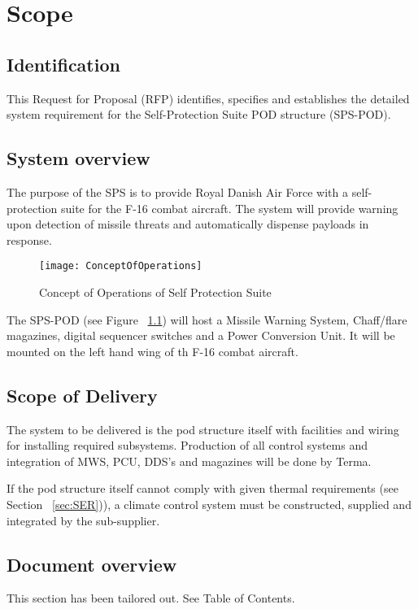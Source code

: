 \documentclass[Main]{subfiles}
\begin{document}
\chapter{Scope}

\section{Identification}
This Request for Proposal (RFP) identifies, specifies and establishes the detailed system requirement for the Self-Protection Suite POD structure (SPS-POD).

\section{System overview}
The purpose of the SPS is to provide Royal Danish Air Force with a self-protection suite for the F-16 combat aircraft. 
The system will provide warning upon detection of missile threats and automatically dispense payloads in response.

\begin{figure}[H]
\centering
\texttt{[image: ConceptOfOperations]}
\caption{Concept of Operations of Self Protection Suite}
\label{fig:conOps}
\end{figure}

The SPS-POD (see Figure ~\ref{fig:conOps}) will host a Missile Warning System, Chaff/flare magazines, digital sequencer switches and a Power Conversion Unit. 
It will be mounted on the left hand wing of th F-16 combat aircraft.

\section{Scope of Delivery}
The system to be delivered is the pod structure itself with facilities and wiring for installing required subsystems. 
Production of all control systems and integration of MWS, PCU, DDS's and magazines will be done by Terma.

If the pod structure itself cannot comply with given thermal requirements (see Section ~\ref{sec:SER})), a climate control system must be constructed, supplied and integrated by the sub-supplier.

\section{Document overview}
This section has been tailored out. See Table of Contents.


\end{document}
